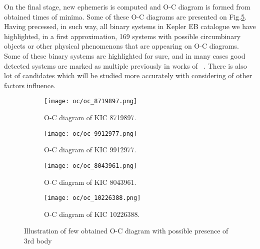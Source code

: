 On the final stage, new ephemeris is computed and O-C diagram is formed from obtained times of minima. Some of these O-C diagrams are presented on Fig.\ref{fig:oc}. Having precessed, in such way, all binary systems in Kepler EB catalogue we have highlighted, in a first approximation, 169 systems with possible circumbinary objects or other physical phenomenons that are appearing on O-C diagrams. Some of these binary systems are highlighted for sure, and in many cases good detected systems are marked as multiple previously in works of ~\cite{gies2012, Rappaport2013, conroy2014}. There is also lot of candidates which will be studied more accurately with considering of other factors influence.   
\begin{figure}[!th] 
  \begin{subfigure}[b]{0.5\linewidth}
    \centering
    \texttt{[image: oc/oc\_8719897.png]} 
    \caption{O-C diagram of KIC 8719897.} 
    \label{fig:oc:a} 
    \vspace{4ex}
  \end{subfigure}%
  \begin{subfigure}[b]{0.5\linewidth}
    \centering
    \texttt{[image: oc/oc\_9912977.png]} 
    \caption{O-C diagram of KIC 9912977.} 
    \label{fig:oc:b} 
    \vspace{4ex}
  \end{subfigure} 
  \begin{subfigure}[b]{0.5\linewidth}
    \centering
    \texttt{[image: oc/oc\_8043961.png]} 
    \caption{O-C diagram of KIC 8043961.} 
    \label{fig:oc:c} 
  \end{subfigure}%
  \begin{subfigure}[b]{0.5\linewidth}
    \centering
    \texttt{[image: oc/oc\_10226388.png]} 
    \caption{O-C diagram of KIC 10226388.} 
    \label{fig:oc:d} 
  \end{subfigure} 
  \caption{Illustration of few obtained O-C diagram with possible presence of 3rd body}
  \label{fig:oc} 
\end{figure}